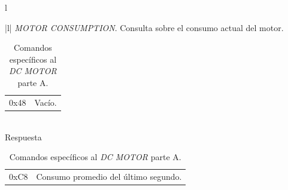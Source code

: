 \begin{table}
\begin{center}
\begin{tabular}{l}
\begin{tabular}{|l|}
				\hline\hline
				\emph{MOTOR CONSUMPTION}. Consulta sobre el consumo actual del motor. \\
				\hline
				\begin{tabular}{c|l}
					0x48 & Vac\'io.\\
				\end{tabular}
				\\
				\hline
				Respuesta \\
				\hline
				\begin{tabular}{c|l}
					0xC8 & Consumo promedio del \'ultimo segundo. \\
				\end{tabular}
				\\
	
				\hline
			\end{tabular}
		\\
		\end{tabular}
		\caption{Comandos espec\'ificos al \emph{DC MOTOR} parte A. }
		\label{hT_comm_comandos_motordc_a}
	\end{center}
\end{table}

